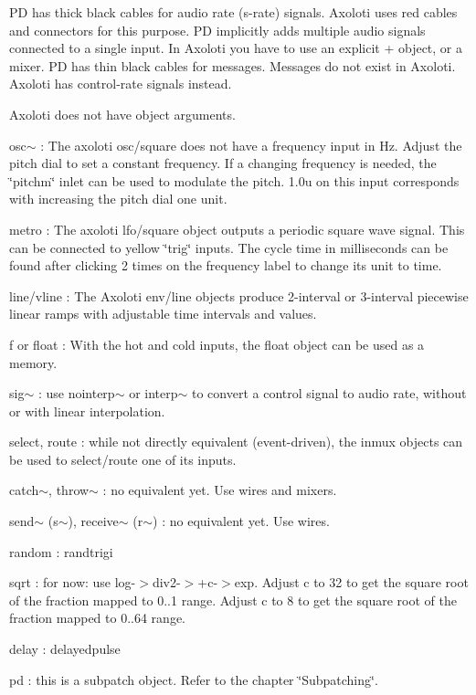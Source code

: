 PD has thick black cables for audio rate (s-\/rate) signals. Axoloti uses red cables and connectors for this purpose. PD implicitly adds multiple audio signals connected to a single input. In Axoloti you have to use an explicit + object, or a mixer. PD has thin black cables for messages. Messages do not exist in Axoloti. Axoloti has control-\/rate signals instead.

Axoloti does not have object arguments.


\begin{DoxyItemize}
\item osc$\sim$ \+: The axoloti osc/square does not have a frequency input in Hz. Adjust the pitch dial to set a constant frequency. If a changing frequency is needed, the \char`\"{}pitchm\char`\"{} inlet can be used to modulate the pitch. 1.\+0u on this input corresponds with increasing the pitch dial one unit. 
\item metro \+: The axoloti lfo/square object outputs a periodic square wave signal. This can be connected to yellow \char`\"{}trig\char`\"{} inputs. The cycle time in milliseconds can be found after clicking 2 times on the frequency label to change its unit to time. 
\item line/vline \+: The Axoloti env/line objects produce 2-\/interval or 3-\/interval piecewise linear ramps with adjustable time intervals and values. 
\item f or float \+: With the hot and cold inputs, the float object can be used as a memory. 
\item sig$\sim$ \+: use nointerp$\sim$ or interp$\sim$ to convert a control signal to audio rate, without or with linear interpolation. 
\item select, route \+: while not directly equivalent (event-\/driven), the inmux objects can be used to select/route one of its inputs. 
\item catch$\sim$, throw$\sim$ \+: no equivalent yet. Use wires and mixers. 
\item send$\sim$ (s$\sim$), receive$\sim$ (r$\sim$) \+: no equivalent yet. Use wires. 
\item random \+: randtrigi 
\item sqrt \+: for now\+: use log-\/$>$div2-\/$>$+c-\/$>$exp. Adjust c to 32 to get the square root of the fraction mapped to 0..1 range. Adjust c to 8 to get the square root of the fraction mapped to 0..64 range. 
\item delay \+: delayedpulse 
\item pd \+: this is a subpatch object. Refer to the chapter \char`\"{}\+Subpatching\char`\"{}. 
\end{DoxyItemize}

